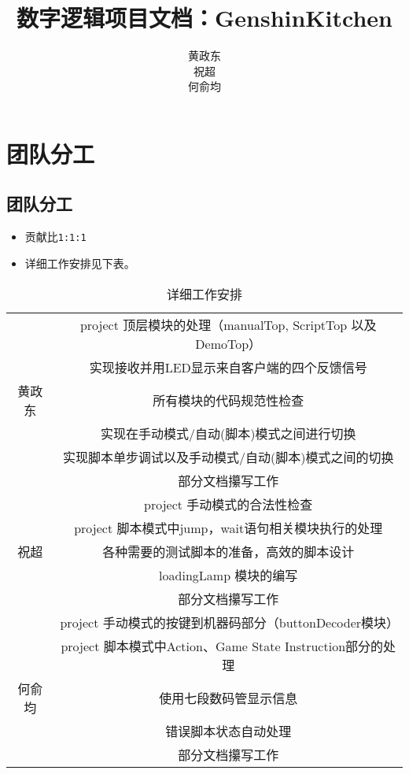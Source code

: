 \documentclass[12pt, a4paper]{ctexart}
\title{数字逻辑项目文档：GenshinKitchen}
\author{黄政东\\祝超\\何俞均}
\date{}
\begin{document}
\maketitle

\newpage
\section{团队分工}
\subsection{团队分工}
\begin{itemize}
    \item 贡献比\texttt{1:1:1}
    \item  详细工作安排见下表。
\end{itemize}
\begin{table}[h]
	\centering
	\begin{tabular}{|c|c|}
		\hline
		~      & project 顶层模块的处理（manualTop, ScriptTop 以及 DemoTop） \\
		\cline{2-2}
		~      & 实现接收并用LED显示来自客户端的四个反馈信号                 \\
		\cline{2-2}
		黄政东 & 所有模块的代码规范性检查                                    \\
		\cline{2-2}
		~      & 实现在手动模式/自动(脚本)模式之间进行切换                   \\
		\cline{2-2}
		~      & 实现脚本单步调试以及手动模式/自动(脚本)模式之间的切换         \\
		\cline{2-2}
		~      & 部分文档攥写工作                                            \\
		\hline

		~      & project 手动模式的合法性检查                                \\
		\cline{2-2}
		~      & project 脚本模式中jump，wait语句相关模块执行的处理          \\
		\cline{2-2}
		祝超   & 各种需要的测试脚本的准备，高效的脚本设计                    \\
		\cline{2-2}
		~      & loadingLamp 模块的编写                                      \\
		\cline{2-2}
		~      & 部分文档攥写工作                                            \\

		\hline
		~      & project 手动模式的按键到机器码部分（buttonDecoder模块）     \\
		\cline{2-2}
		~      & project 脚本模式中Action、Game State Instruction部分的处理  \\
		\cline{2-2}
		何俞均 & 使用七段数码管显示信息                   \\
		\cline{2-2}
		~      & 错误脚本状态自动处理                                        \\
		\cline{2-2}
		~      & 部分文档攥写工作                                            \\
		\hline
	\end{tabular}
	\caption{详细工作安排}
\end{table}
\end{document}
